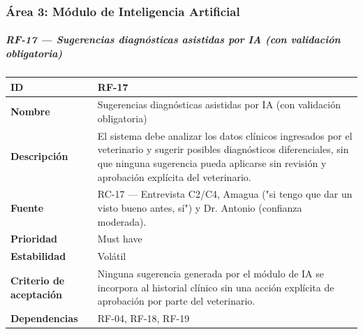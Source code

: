 \subsubsection{Área 3: Módulo de Inteligencia
Artificial}\label{uxe1rea-3-muxf3dulo-de-inteligencia-artificial}

\subparagraph{RF-17 --- Sugerencias diagnósticas asistidas por IA (con
validación
obligatoria)}\label{rf-17-sugerencias-diagnuxf3sticas-asistidas-por-ia-con-validaciuxf3n-obligatoria}

{\def\LTcaptype{none} %
\begin{longtable}[]{@{}
  >{\raggedright\arraybackslash}p{}
  >{\raggedright\arraybackslash}p{}@{}}
\toprule\noalign{}
\begin{minipage}[b]{\linewidth}\raggedright
\textbf{ID}
\end{minipage} & \begin{minipage}[b]{\linewidth}\raggedright
RF-17
\end{minipage} \\
\midrule\noalign{}
\endhead
\bottomrule\noalign{}
\endlastfoot
\textbf{Nombre} & \begin{minipage}[t]{\linewidth}\raggedright
Sugerencias diagnósticas asistidas por IA (con validación obligatoria)
\end{minipage} \\
\textbf{Descripción} & \begin{minipage}[t]{\linewidth}\raggedright
El sistema debe analizar los datos clínicos ingresados por el
veterinario y sugerir posibles diagnósticos diferenciales, sin que ninguna sugerencia pueda
aplicarse sin revisión y aprobación explícita del veterinario.
\end{minipage} \\
\textbf{Fuente} & \begin{minipage}[t]{\linewidth}\raggedright
RC-17 --- Entrevista C2/C4, Amagua ("si tengo que dar un visto bueno
antes, sí") y Dr. Antonio (confianza moderada).
\end{minipage} \\
\textbf{Prioridad} & \begin{minipage}[t]{\linewidth}\raggedright
Must have
\end{minipage} \\
\textbf{Estabilidad} & \begin{minipage}[t]{\linewidth}\raggedright
Volátil
\end{minipage} \\
\textbf{Criterio de aceptación} &
\begin{minipage}[t]{\linewidth}\raggedright
Ninguna sugerencia generada por el módulo de IA se incorpora al
historial clínico sin una acción explícita de aprobación por parte del
veterinario.
\end{minipage} \\
\textbf{Dependencias} & \begin{minipage}[t]{\linewidth}\raggedright
RF-04, RF-18, RF-19
\end{minipage} \\
\end{longtable}
}

